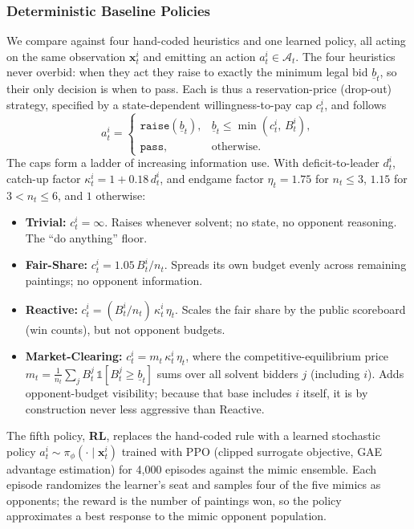 \documentclass[conference]{IEEEtran}
\begin{document}
\subsubsection{Deterministic Baseline Policies}
\label{sec:auction-baselines}
We compare against four hand-coded heuristics and one learned policy, all acting on the same observation $\mathbf{x}^i_t$ and emitting an action $a^i_t \in \mathcal{A}_t$. The four heuristics never overbid: when they act they raise to exactly the minimum legal bid $\underline{b}_t$, so their only decision is when to pass. Each is thus a reservation-price (drop-out) strategy, specified by a state-dependent willingness-to-pay cap $c^i_t$, and follows
\begin{equation}
a^i_t =
\begin{cases}
\texttt{raise}(\underline{b}_t), & \underline{b}_t \le \min(c^i_t,\, B^i_t),\\[2pt]
\texttt{pass}, & \text{otherwise.}
\end{cases}
\end{equation}
The caps form a ladder of increasing information use. With deficit-to-leader $d^i_t$, catch-up factor $\kappa^i_t = 1 + 0.18\,d^i_t$, and endgame factor $\eta_t = 1.75$ for $n_t \le 3$, $1.15$ for $3 < n_t \le 6$, and $1$ otherwise:
\begin{itemize}
\item \textbf{Trivial:} $c^i_t = \infty$. Raises whenever solvent; no state, no opponent reasoning. The ``do anything'' floor.
\item \textbf{Fair-Share:} $c^i_t = 1.05\,B^i_t / n_t$. Spreads its own budget evenly across remaining paintings; no opponent information.
\item \textbf{Reactive:} $c^i_t = (B^i_t / n_t)\,\kappa^i_t\,\eta_t$. Scales the fair share by the public scoreboard (win counts), but not opponent budgets.
\item \textbf{Market-Clearing:} $c^i_t = m_t\,\kappa^i_t\,\eta_t$, where the competitive-equilibrium price $m_t = \tfrac{1}{n_t}\sum_{j} B^j_t\,\mathbb{1}[B^j_t \ge \underline{b}_t]$ sums over all solvent bidders $j$ (including $i$). Adds opponent-budget visibility; because that base includes $i$ itself, it is by construction never less aggressive than Reactive.
\end{itemize}

The fifth policy, \textbf{RL}, replaces the hand-coded rule with a learned stochastic policy $a^i_t \sim \pi_\phi(\cdot \mid \mathbf{x}^i_t)$ trained with PPO (clipped surrogate objective, GAE advantage estimation) for 4{,}000 episodes against the mimic ensemble. Each episode randomizes the learner's seat and samples four of the five mimics as opponents; the reward is the number of paintings won, so the policy approximates a best response to the mimic opponent population.
\end{document}
